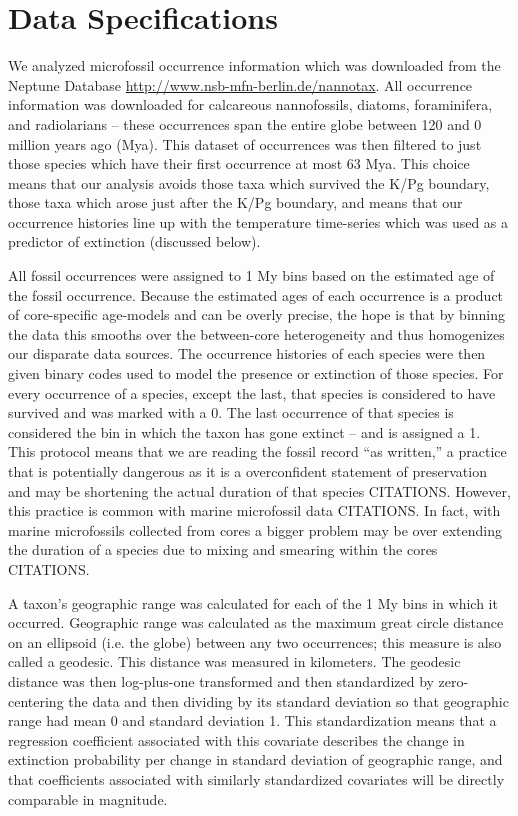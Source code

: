 \documentclass[12pt,letterpaper]{article}
\begin{document}
\section{Data Specifications}

We analyzed microfossil occurrence information which was downloaded from the Neptune Database \url{http://www.nsb-mfn-berlin.de/nannotax}. All occurrence information was downloaded for calcareous nannofossils, diatoms, foraminifera, and radiolarians -- these occurrences span the entire globe between 120 and 0 million years ago (Mya). This dataset of occurrences was then filtered to just those species which have their first occurrence at most 63 Mya. This choice means that our analysis avoids those taxa which survived the K/Pg boundary, those taxa which arose just after the K/Pg boundary, and means that our occurrence histories line up with the temperature time-series which was used as a predictor of extinction (discussed below).

All fossil occurrences were assigned to 1 My bins based on the estimated age of the fossil occurrence. Because the estimated ages of each occurrence is a product of core-specific age-models and can be overly precise, the hope is that by binning the data this smooths over the between-core heterogeneity and thus homogenizes our disparate data sources. The occurrence histories of each species were then given binary codes used to model the presence or extinction of those species. For every occurrence of a species, except the last, that species is considered to have survived and was marked with a 0. The last occurrence of that species is considered the bin in which the taxon has gone extinct -- and is assigned a 1. This protocol means that we are reading the fossil record ``as written,'' a practice that is potentially dangerous as it is a overconfident statement of preservation and may be shortening the actual duration of that species CITATIONS. However, this practice is common with marine microfossil data CITATIONS. In fact, with marine microfossils collected from cores a bigger problem may be over extending the duration of a species due to mixing and smearing within the cores CITATIONS.

A taxon's geographic range was calculated for each of the 1 My bins in which it occurred. Geographic range was calculated as the maximum great circle distance on an ellipsoid (i.e. the globe) between any two occurrences; this measure is also called a geodesic. This distance was measured in kilometers. The geodesic distance was then log-plus-one transformed and then standardized by zero-centering the data and then dividing by its standard deviation so that geographic range had mean 0 and standard deviation 1. This standardization means that a regression coefficient associated with this covariate describes the change in extinction probability per change in standard deviation of geographic range, and that coefficients associated with similarly standardized covariates will be directly comparable in magnitude.
\end{document}
